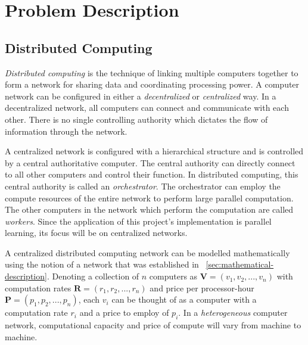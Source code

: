 \documentclass[../mthe-493-final-project.tex]{subfiles}
\begin{document}
    \chapter{Problem Description}
    \label{ch:problem-description}
    
    \section{Distributed Computing}
    \label{sec:distributed-computing-problem-description}


    \textit{Distributed computing} is the technique of linking multiple computers together to form a network for sharing data and coordinating processing power. A computer network can be configured in either a \textit{decentralized} or \textit{centralized} way. In a decentralized network, all computers can connect and communicate with each other. There is no single controlling authority which dictates the flow of information through the network.

    A centralized network is configured with a hierarchical structure and is controlled by a central authoritative computer. The central authority can directly connect to all other computers and control their function. In distributed computing, this central authority is called an \textit{orchestrator}. The orchestrator can employ the compute resources of the entire network to perform large parallel computation. The other computers in the network which perform the computation are called \textit{workers}. Since the application of this project's implementation is parallel learning, its focus will be on centralized networks.

    A centralized distributed computing network can be modelled mathematically using the notion of a network that was established in ~\autoref{sec:mathematical-description}. Denoting a collection of $n$ computers as $\mathbf{V} = (v_1, v_2, ..., v_n)$ with computation rates $\mathbf{R} = (r_1, r_2, ..., r_n)$ and price per processor-hour $\mathbf{P} = (p_1, p_2, ..., p_n)$, each $v_i$ can be thought of as a computer with a computation rate $r_i$ and a price to employ of $p_i$. In a \textit{heterogeneous} computer network, computational capacity and price of compute will vary from machine to machine.
\end{document}
